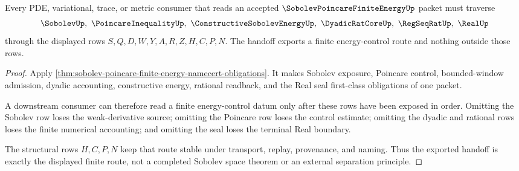 \begin{theorem}
\label{thm:sobolev-poincare-finite-energy-handoff}
Every PDE, variational, trace, or metric consumer that reads an accepted $\SobolevPoincareFiniteEnergyUp$ packet must traverse
$$
\SobolevUp,\ \PoincareInequalityUp,\ \ConstructiveSobolevEnergyUp,\ \DyadicRatCoreUp,\ \RegSeqRatUp,\ \RealUp
$$
through the displayed rows $S,Q,D,W,Y,A,R,Z,H,C,P,N$. The handoff exports a finite energy-control route and nothing outside those rows.
\end{theorem}
\begin{proof}
Apply \autoref{thm:sobolev-poincare-finite-energy-namecert-obligations}. It makes Sobolev exposure, Poincare control, bounded-window admission, dyadic accounting, constructive energy, rational readback, and the Real seal first-class obligations of one packet.

A downstream consumer can therefore read a finite energy-control datum only after these rows have been exposed in order. Omitting the Sobolev row loses the weak-derivative source; omitting the Poincare row loses the control estimate; omitting the dyadic and rational rows loses the finite numerical accounting; and omitting the seal loses the terminal Real boundary.

The structural rows $H,C,P,N$ keep that route stable under transport, replay, provenance, and naming. Thus the exported handoff is exactly the displayed finite route, not a completed Sobolev space theorem or an external separation principle.
\end{proof}


\begin{closurestatus}{\SobolevPoincareFiniteEnergyUp}
  \theoryclosure{\seedClosure}
  \formalstatus{\unformalizedV}
\end{closurestatus}
